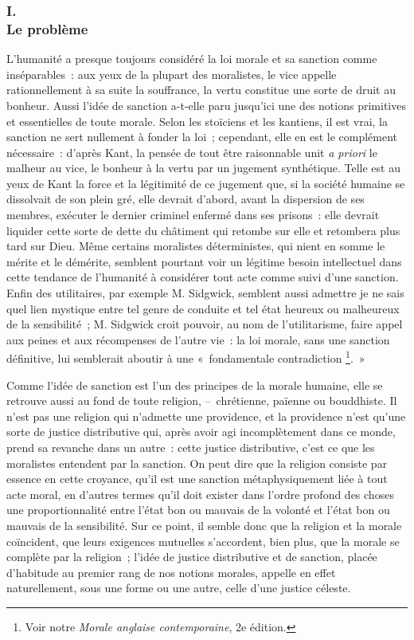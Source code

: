 \documentclass[french,twoside]{book} %
\begin{document}
\subsubsection[{I. Le problème}]{I. \\
Le problème}
\noindent L’humanité a presque toujours considéré la loi morale et sa sanction comme inséparables : aux yeux de la plupart des moralistes, le vice appelle rationnellement à sa suite la souffrance, la vertu constitue une sorte de druit au bonheur. Aussi l’idée de sanction a-t-elle paru jusqu’ici une des notions primitives et essentielles de toute morale. Selon les stoïciens et les kantiens, il est vrai, la sanction ne sert nullement à fonder la loi ; cependant, elle en est le complément nécessaire : d’après Kant, la pensée de tout être raisonnable unit \emph{a priori} le malheur au vice, le bonheur à la vertu par un jugement synthétique. Telle est au yeux de Kant la force et la légitimité de ce jugement que, si la société humaine se dissolvait de son plein gré, elle devrait d’abord, avant la dispersion de ses membres, exécuter le dernier criminel enfermé dans ses prisons : elle devrait liquider cette sorte de dette du châtiment qui retombe sur elle et retombera plus tard sur Dieu. Même certains moralistes déterministes, qui nient en somme le mérite et le démérite, semblent pourtant voir un légitime besoin intellectuel dans cette tendance de l’humanité à considérer tout acte comme suivi d’une sanction. Enfin des utilitaires, par exemple M. Sidgwick, semblent aussi admettre je ne sais quel lien mystique entre tel genre de conduite et tel état heureux ou malheureux de la sensibilité ; M. Sidgwick croit pouvoir, au nom de l’utilitarisme, faire appel aux peines et aux récompenses de l’autre vie : la loi morale, sans une sanction définitive, lui semblerait aboutir à une « fondamentale contradiction \footnote{Voir notre \emph{Morale anglaise contemporaine}, 2e édition.}. »\par
Comme l’idée de sanction est l’un des principes de la morale humaine, elle se retrouve aussi au fond de toute religion, – chrétienne, païenne ou bouddhiste. Il n’est pas une religion qui n’admette une providence, et la providence n’est qu’une sorte de justice distributive qui, après avoir agi incomplètement dans ce monde, prend sa revanche dans un autre : cette justice distributive, c’est ce que les moralistes entendent par la sanction. On peut dire que la religion consiste par essence en cette croyance, qu’il est une sanction métaphysiquement liée à tout acte moral, en d’autres termes qu’il doit exister dans l’ordre profond des choses une proportionnalité entre l’état bon ou mauvais de la volonté et l’état bon ou mauvais de la sensibilité. Sur ce point, il semble donc que la religion et la morale coïncident, que leurs exigences mutuelles s’accordent, bien plus, que la morale se complète par la religion ; l’idée de justice distributive et de sanction, placée d’habitude au premier rang de nos notions morales, appelle en effet naturellement, sous une forme ou une autre, celle d’une justice céleste.\par
\end{document}
